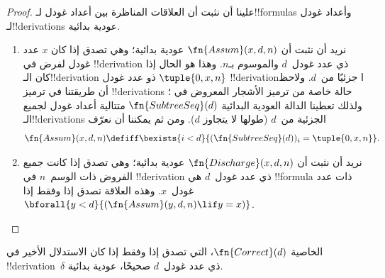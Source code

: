 \documentclass[../../../include/open-logic-section]{subfiles}
\begin{document}
\begin{proof}
  علينا أن نثبت أن العلاقات المناظرة بين أعداد غودل لـ!!{formula}s
  وأعداد غودل لـ!!{derivation}s عودية بدائية.
  \begin{enumerate}
  \item نريد أن نثبت أن $\fn{Assum}(x,d,n)$ عودية بدائية؛ وهي تصدق
    إذا كان $x$ عدد غودل لفرض في !!{derivation} ذي عدد غودل~$d$
    والموسوم بـ$n$. وهذا هو الحال إذا كان الـ!!{derivation} ذو عدد غودل
    $\tuple{0,x,n}$ !!{derivation}ًا جزئيًا من~$d$. ولاحظ أن طريقتنا في
    ترميز !!{derivation}s حالة خاصة من ترميز الأشجار المعروض في
    ؛ ولذلك تعطينا الدالة العودية البدائية
    $\fn{SubtreeSeq}(d)$ متتالية أعداد غودل لجميع الـ!!{derivation}s
    الجزئية من~$d$ (طولها لا يتجاوز $d$). ومن ثم يمكننا أن نعرّف
    \[
    \fn{Assum}(x, d, n) \defiff \bexists{i<d}{(\fn{SubtreeSeq}(d))_i =
      \tuple{0, x, n}}.
    \]
  \item نريد أن نثبت أن $\fn{Discharge}(x,d,n)$ عودية بدائية؛ وهي
    تصدق إذا كانت جميع الفروض ذات الوسم~$n$ في !!{derivation} ذي عدد
    غودل~$d$ هي !!{formula} ذات عدد غودل~$x$. وهذه العلاقة تصدق إذا
    وفقط إذا
    $\bforall{y<d}{(\fn{Assum}(y,d,n) \lif y=x)}$.
  \end{enumerate}
\end{proof}

\begin{prop}
  الخاصية $\fn{Correct}(d)$، التي تصدق إذا وفقط إذا كان الاستدلال
  الأخير في !!{derivation}~$\delta$ ذي عدد غودل~$d$ صحيحًا، عودية
  بدائية.
\end{prop}
\end{document}
